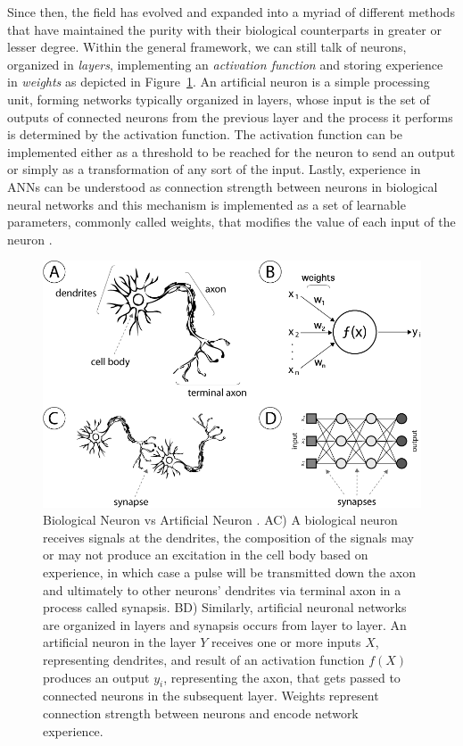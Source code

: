 Since then, the field has evolved and expanded into a myriad of different methods that have maintained the purity with their biological counterparts in greater or lesser degree.
Within the general framework, we can still talk of neurons, organized in \emph{layers}, implementing an \emph{activation function} and storing experience in \emph{weights} as depicted in Figure~\ref{fig:sec:theory:neurons}.
An artificial neuron is a simple processing unit, forming networks typically organized in layers, whose input is the set of outputs of connected neurons from the previous layer and the process it performs is determined by the activation function.
The activation function can be implemented either as a threshold to be reached for the neuron to send an output or simply as a transformation of any sort of the input.
Lastly, experience in ANNs can be understood as connection strength between neurons in biological neural networks and this mechanism is implemented as a set of learnable parameters, commonly called weights, that modifies the value of each input of the neuron \cite{Hinton1990}.

\begin{figure}[htb]
  \includegraphics[width=\textwidth]{gfx/neurons}
  \caption{Biological Neuron vs Artificial Neuron \cite{Honorio2013}.
    AC) A biological neuron receives signals at the dendrites, the composition of the signals may or may not produce an excitation in the cell body based on experience, in which case a pulse will be transmitted down the axon and ultimately to other neurons' dendrites via terminal axon in a process called synapsis.
    BD) Similarly, artificial neuronal networks are organized in layers and synapsis occurs from layer to layer.
    An artificial neuron in the layer $Y$ receives one or more inputs $X$, representing dendrites, and result of an activation function $f(X)$ produces an output $y_i$, representing the axon, that gets passed to connected neurons in the subsequent layer.
    Weights represent connection strength between neurons and encode network experience.}
  \label{fig:sec:theory:neurons}
\end{figure}

